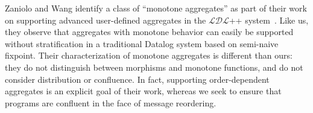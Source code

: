 Zaniolo and Wang identify a class of ``monotone aggregates'' as part of their
work on supporting advanced user-defined aggregates in the $\mathcal{LDL}$++
system~\cite{Zaniolo1999}. Like us, they observe that aggregates with monotone
behavior can easily be supported without stratification in a traditional Datalog
system based on semi-naive fixpoint. Their characterization of monotone
aggregates is different than ours: they do not distinguish between morphisms and
monotone functions, and do not consider distribution or confluence.  In fact,
supporting order-dependent aggregates is an explicit goal of their work, whereas
we seek to ensure that programs are confluent in the face of message reordering.
